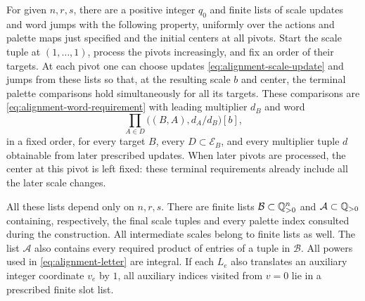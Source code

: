\begin{lemma}\label{lem:finite-word-plan}
For given $n,r,s$, there are a positive integer $q_0$ and finite
lists of scale updates and word jumps with the following property,
uniformly over the actions and palette maps just specified and the
initial centers at all pivots.  Start the scale tuple at $(1,\ldots,1)$,
process the pivots increasingly, and fix an order of their targets.
At each pivot one can choose updates
\eqref{eq:alignment-scale-update} and jumps from these lists so that,
at the resulting scale $b$ and center, the terminal palette comparisons
hold simultaneously for all its targets.  These comparisons are
\eqref{eq:alignment-word-requirement} with leading multiplier $d_B$
and word
\begin{equation}\label{eq:alignment-terminal-word}
 \prod_{A\in D}\bigl((B,A),d_A/d_B\bigr)[b],
\end{equation}
in a fixed order, for every target $B$, every $D\subset\mathcal E_B$,
and every multiplier tuple $d$ obtainable from later prescribed updates.
When later pivots are processed, the center at this pivot is left fixed:
these terminal requirements already include all the later scale changes.

All these lists depend only on $n,r,s$.  There are finite lists
$\mathcal B\subset\mathbb Q_{>0}^n$ and $\mathcal A\subset\mathbb Q_{>0}$
containing, respectively, the final scale tuples and every palette index
consulted during the construction.  All intermediate scales belong to
finite lists as well.  The list $\mathcal A$ also contains every required
product of entries of a tuple in $\mathcal B$.  All powers used in
\eqref{eq:alignment-letter} are integral.  If each $L_e$ also translates
an auxiliary integer coordinate $v_e$ by $1$, all auxiliary indices
visited from $v=0$ lie in a prescribed finite slot list.
\end{lemma}

